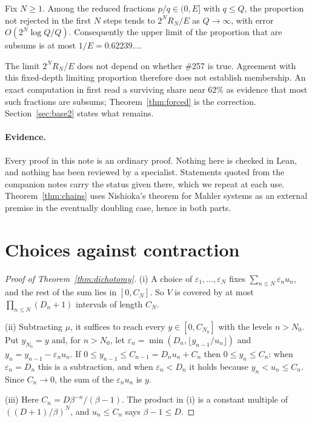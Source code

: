 \documentclass[11pt]{article}
\begin{document}
\begin{theorem}\label{thm:forced}
Fix $N\ge1$.  Among the reduced fractions $p/q\in(0,E]$ with $q\le Q$, the
proportion not rejected in the first $N$ steps tends to $2^NR_N/E$ as
$Q\to\infty$, with error $O(2^N\log Q/Q)$.  Consequently the upper limit of
the proportion that are subsums is at most $1/E=0.62239\ldots$.
\end{theorem}

The limit $2^NR_N/E$ does not depend on whether \#257 is true.  Agreement with
this fixed-depth limiting proportion therefore does not establish membership.
An exact computation in \cite{plectisinvestigation} first read a surviving
share near $62\%$ as evidence that most such fractions are subsums;
Theorem~\ref{thm:forced} is the correction.  Section~\ref{sec:base2} states
what remains.

\paragraph{Evidence.}  Every proof in this note is an ordinary proof.  Nothing
here is checked in Lean, and nothing has been reviewed by a specialist.
Statements quoted from the companion notes carry the status given there, which
we repeat at each use.  Theorem~\ref{thm:chains} uses Nishioka's theorem for Mahler systems as an
external premise in the eventually doubling case, hence in both parts.

\section{Choices against contraction}\label{sec:dichotomy}

\begin{proof}[Proof of Theorem~\ref{thm:dichotomy}]
(i) A choice of $\varepsilon_1,\dots,\varepsilon_N$ fixes
$\sum_{n\le N}\varepsilon_nu_n$, and the rest of the sum lies in $[0,C_N]$.
So $V$ is covered by at most $\prod_{n\le N}(D_n+1)$ intervals of length $C_N$.

(ii) Subtracting $\mu$, it suffices to reach every $y\in[0,C_{N_0}]$ with the
levels $n>N_0$.  Put $y_{N_0}=y$ and, for $n>N_0$, let
$\varepsilon_n=\min(D_n,\lfloor y_{n-1}/u_n\rfloor)$ and
$y_n=y_{n-1}-\varepsilon_nu_n$.  If $0\le y_{n-1}\le C_{n-1}=D_nu_n+C_n$ then
$0\le y_n\le C_n$: when $\varepsilon_n=D_n$ this is a subtraction, and when
$\varepsilon_n<D_n$ it holds because $y_n<u_n\le C_n$.  Since $C_n\to0$, the
sum of the $\varepsilon_nu_n$ is $y$.

(iii) Here $C_n=D\beta^{-n}/(\beta-1)$.  The product in (i) is a constant
multiple of $((D+1)/\beta)^N$, and $u_n\le C_n$ says $\beta-1\le D$.
\end{proof}
\end{document}
